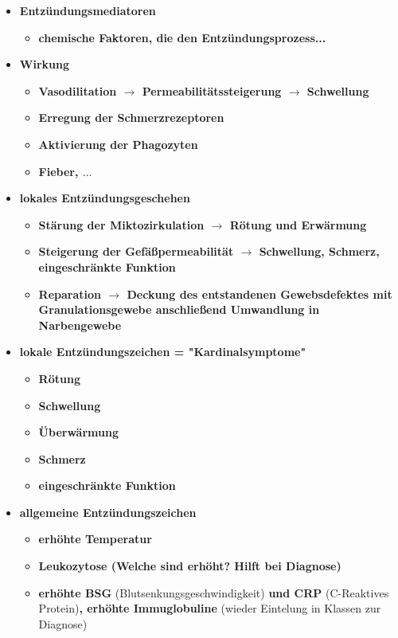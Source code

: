 \begin{itemize}
\begin{itemize}
			\end{itemize}
		\item \textbf{Entzündungsmediatoren}
			\begin{itemize}
				\item \textbf{chemische Faktoren, die den Entzündungsprozess...}
			\end{itemize}
		\item \textbf{Wirkung}
			\begin{itemize}
				\item \textbf{Vasodilitation $\rightarrow$ Permeabilitätssteigerung $\rightarrow$ Schwellung }
				\item \textbf{Erregung der Schmerzrezeptoren}
				\item \textbf{Aktivierung der Phagozyten}
				\item \textbf{Fieber, $\dots$}
			\end{itemize}
		\item \textbf{lokales Entzündungsgeschehen}
			\begin{itemize}
				\item \textbf{Stärung der Miktozirkulation $\rightarrow$ Rötung und Erwärmung}
				\item \textbf{Steigerung der Gefäßpermeabilität $\rightarrow$ Schwellung, Schmerz, eingeschränkte Funktion}
				\item \textbf{Reparation $\rightarrow$ Deckung des entstandenen Gewebsdefektes mit Granulationsgewebe anschließend Umwandlung in Narbengewebe}
			\end{itemize}
		\item \textbf{lokale Entzündungszeichen = "Kardinalsymptome"}
			\begin{itemize}
				\item \textbf{Rötung}
				\item \textbf{Schwellung}
				\item \textbf{Überwärmung}
				\item \textbf{Schmerz}
				\item \textbf{eingeschränkte Funktion}
			\end{itemize}
\pagebreak
		\item \textbf{allgemeine Entzündungszeichen}
			\begin{itemize}
				\item \textbf{erhöhte Temperatur}
				\item \textbf{Leukozytose (Welche sind erhöht? Hilft bei Diagnose)}
				\item \textbf{erhöhte BSG} (Blutsenkungsgeschwindigkeit) \textbf{und CRP} (C-Reaktives Protein)\textbf{, erhöhte Immuglobuline} (wieder Eintelung in Klassen zur Diagnose)

\end{itemize}
\end{itemize}
